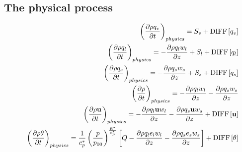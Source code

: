 \subsection{The physical process}
\begin{eqnarray}
&& \left( \frac{\partial \rho q_v}{\partial t} \right)_{physics}  = S_v
+{\rm DIFF}\left[q_v \right]
\label{eq:rho_v_p2}\\
&& \left( \frac{\partial \rho q_l}{\partial t} \right)_{physics}
= - \frac{\partial \rho q_l w_l}{\partial z}+S_l
+{\rm DIFF}\left[q_l \right]
\label{eq:rho_l_p2}\\
&& \left( \frac{\partial \rho q_s}{\partial t} \right)_{physics}
=- \frac{\partial \rho q_s w_s}{\partial z}+S_s
+{\rm DIFF}\left[q_s \right]
\label{eq:rho_s_p2}\\
&& \left( \frac{\partial \rho}{\partial t} \right)_{physics}
=- \frac{\partial \rho q_l w_l}{\partial z}
 - \frac{\partial \rho q_s w_s}{\partial z}
 \label{eq:rhotot_p2}\\
&& \left( \frac{\partial \rho {\bf u}}{\partial t} \right)_{physics}
=
- \frac{\partial \rho q_l {\bf u} w_l}{\partial z}
- \frac{\partial \rho q_s {\bf u} w_s}{\partial z}
+{\rm DIFF}\left[{\bf u} \right]
 \label{eq:momtot_p2}\\
&& \left( \frac{\partial \rho \theta  }{\partial t} \right)_{physics}
=  \frac{1}{c_p^*} \left(\frac{p}{p_{00}}\right)^{\frac{R^*}{c_p^*}}
\left[Q
 - \frac{\partial \rho q_l e_l w_l}{\partial z}
 - \frac{\partial \rho q_s e_s w_s}{\partial z}
\right]
 + {\rm DIFF}\left[\theta \right] \label{eq:etot_p2}
\end{eqnarray}

